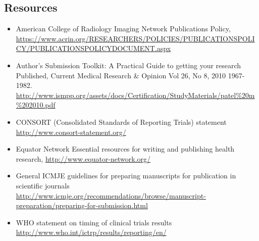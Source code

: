 \documentclass[]{book}
\providecommand{\tightlist}{%
  \setlength{\itemsep}{0pt}\setlength{\parskip}{0pt}}
\begin{document}
\subsection{Resources}\label{resources-18}

\begin{itemize}
\tightlist
\item
  American College of Radiology Imaging Network Publications Policy,
  \url{https://www.acrin.org/RESEARCHERS/POLICIES/PUBLICATIONSPOLICY/PUBLICATIONSPOLICYDOCUMENT.aspx}
\item
  Author's Submission Toolkit: A Practical Guide to getting your
  research Published, Current Medical Research \& Opinion Vol 26, No 8,
  2010 1967-1982.
  \url{http://www.ismpp.org/assets/docs/Certification/StudyMaterials/patel\%20m\%202010.pdf}
\item
  CONSORT (Consolidated Standards of Reporting Trials) statement
  \url{http://www.consort-statement.org/}
\item
  Equator Network Essential resources for writing and publishing health
  research, \url{http://www.equator-network.org/}
\item
  General ICMJE guidelines for preparing manuscripts for publication in
  scientific journals
  \url{http://www.icmje.org/recommendations/browse/manuscript-preparation/preparing-for-submission.html}
\item
  WHO statement on timing of clinical trials results
  \url{http://www.who.int/ictrp/results/reporting/en/}
\end{itemize}
\end{document}
